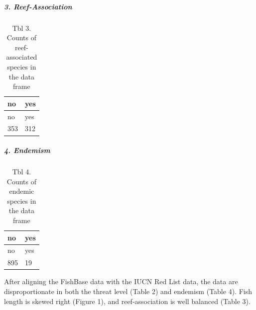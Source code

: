 \documentclass[
  letterpaper,
  DIV=11,
  numbers=noendperiod]{scrartcl}
\let\oldsubparagraph\subparagraph
\renewcommand{\subparagraph}[1]{\oldsubparagraph{#1}\mbox{}}
\newenvironment{Shaded}{\begin{snugshade}}{\end{snugshade}}
\newcommand{\AttributeTok}[1]{\textcolor[rgb]{0.40,0.45,0.13}{#1}}
\newcommand{\FunctionTok}[1]{\textcolor[rgb]{0.28,0.35,0.67}{#1}}
\newcommand{\NormalTok}[1]{\textcolor[rgb]{0.00,0.23,0.31}{#1}}
\newcommand{\OtherTok}[1]{\textcolor[rgb]{0.00,0.23,0.31}{#1}}
\newcommand{\SpecialCharTok}[1]{\textcolor[rgb]{0.37,0.37,0.37}{#1}}
\newcommand{\StringTok}[1]{\textcolor[rgb]{0.13,0.47,0.30}{#1}}
\begin{document}
\hypertarget{reef-association}{%
\subparagraph{3. Reef-Association}\label{reef-association}}

\begin{Shaded}
\end{Shaded}

\begin{longtable}[]{@{}ll@{}}
\caption{Tbl 3. Counts of reef-associated species in the data
frame}\tabularnewline
\toprule()
no & yes \\
\midrule()
\endfirsthead
\toprule()
no & yes \\
\midrule()
\endhead
353 & 312 \\
\bottomrule()
\end{longtable}

\hypertarget{endemism}{%
\subparagraph{4. Endemism}\label{endemism}}

\begin{Shaded}
\end{Shaded}

\begin{longtable}[]{@{}ll@{}}
\caption{Tbl 4. Counts of endemic species in the data
frame}\tabularnewline
\toprule()
no & yes \\
\midrule()
\endfirsthead
\toprule()
no & yes \\
\midrule()
\endhead
895 & 19 \\
\bottomrule()
\end{longtable}

After aligning the FishBase data with the IUCN Red List data, the data
are disproportionate in both the threat level (Table 2) and endemism
(Table 4). Fish length is skewed right (Figure 1), and reef-association
is well balanced (Table 3).
\end{document}
